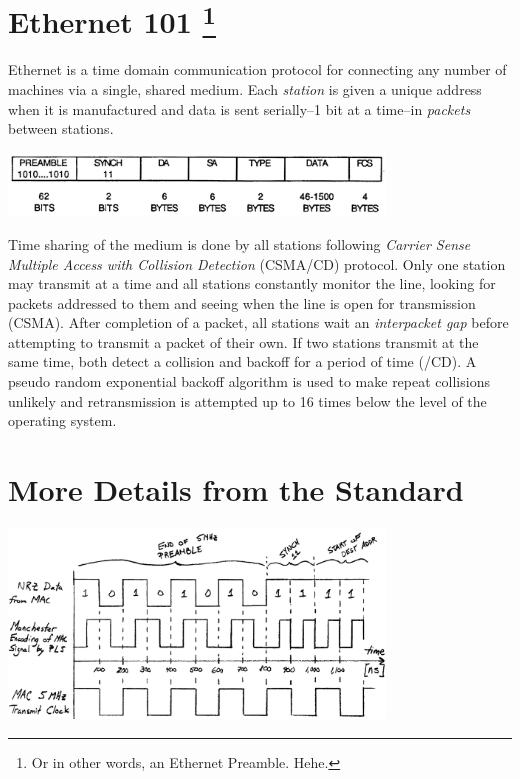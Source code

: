 \documentclass{article}
\begin{document}
\section[title]{Ethernet 101 \footnote{Or in other words, an Ethernet Preamble. Hehe.}}

Ethernet is a time domain communication protocol for connecting any number of
machines via a single, shared medium.
Each \textit{station} is given a unique address when it is manufactured and
data is sent serially--1 bit at a time--in \textit{packets} between
stations.

\begin{center}
	\includegraphics[width=0.75\textwidth]{ethernet_packet.png}
	\label{packet-format}
\end{center}

Time sharing of the medium is done by all stations following
\textit{Carrier Sense Multiple Access with Collision Detection}
(CSMA/CD) protocol.
Only one station may transmit at a time and all stations constantly
monitor the line, looking for packets addressed to them and seeing when
the line is open for transmission (CSMA).
After completion of a packet, all stations wait an
\textit{interpacket gap} before attempting to transmit a packet of their own.
If two stations transmit at the same time, both detect a collision
and backoff for a period of time (/CD).
A pseudo random exponential backoff algorithm is used to make repeat
collisions unlikely and retransmission is attempted up to 16 times
below the level of the operating system.

\section{More Details from the Standard}

\begin{center}
	\includegraphics[width=0.75\textwidth]{timing_diagram.png}
	\label{timing-diagram}
\end{center}
\end{document}
